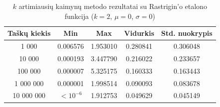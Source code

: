 \begin{table}[H]
    \centering
    \begin{tabular}{|c|c|c|c|c|}
        \hline
        \textbf{Taškų kiekis} & \textbf{Min} & \textbf{Max} & \textbf{Vidurkis} & \textbf{Std. nuokrypis} \\ \hline
        1 000        & 0.006576 & 1.953010 & 0.280841 & 0.306048 \\ \hline
        10 000       & 0.000193 & 3.447790 & 0.216022 & 0.233657 \\ \hline
        100 000      & 0.000007 & 5.325175 & 0.160333 & 0.163443 \\ \hline
        1 000 000    & 0.000001 & 1.998514 & 0.090093 & 0.083678 \\ \hline
        10 000 000   & $<10^{-6}$ & 1.912753 & 0.049629 & 0.045149 \\ \hline
    \end{tabular}
    \caption{$k$ artimiausių kaimynų metodo rezultatai su Rastrigin'o etalono funkcija ($k = 2$, $\mu = 0$, $\sigma = 0$)}
\end{table}